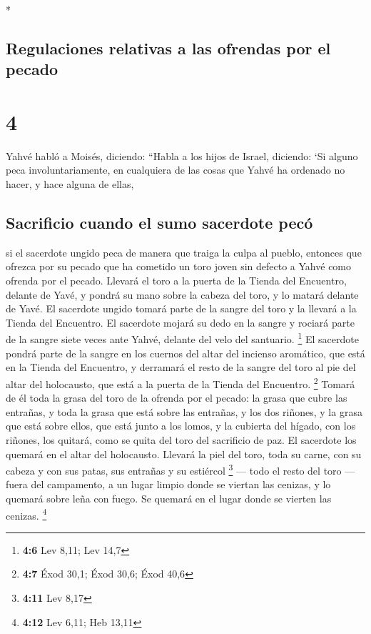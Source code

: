 \begin{paracol}{2}
\begin{otherlanguage}{english}
\end{otherlanguage}

\switchcolumn[0]*

\hypertarget{regulaciones-relativas-a-las-ofrendas-por-el-pecado}{%
\subsection{Regulaciones relativas a las ofrendas por el
pecado}\label{regulaciones-relativas-a-las-ofrendas-por-el-pecado}}

\hypertarget{section-6}{%
\section{4}\label{section-6}}

 Yahvé habló a Moisés, diciendo:  ``Habla a
los hijos de Israel, diciendo: `Si alguno peca involuntariamente, en
cualquiera de las cosas que Yahvé ha ordenado no hacer, y hace alguna de
ellas,

\hypertarget{sacrificio-cuando-el-sumo-sacerdote-pecuxf3}{%
\subsection{Sacrificio cuando el sumo sacerdote
pecó}\label{sacrificio-cuando-el-sumo-sacerdote-pecuxf3}}

 si el sacerdote ungido peca de manera que traiga la culpa
al pueblo, entonces que ofrezca por su pecado que ha cometido un toro
joven sin defecto a Yahvé como ofrenda por el pecado. 
Llevará el toro a la puerta de la Tienda del Encuentro, delante de Yavé,
y pondrá su mano sobre la cabeza del toro, y lo matará delante de Yavé.
 El sacerdote ungido tomará parte de la sangre del toro y
la llevará a la Tienda del Encuentro.  El sacerdote mojará
su dedo en la sangre y rociará parte de la sangre siete veces ante
Yahvé, delante del velo del santuario. \footnote{\textbf{4:6} Lev 8,11;
  Lev 14,7}  El sacerdote pondrá parte de la sangre en los
cuernos del altar del incienso aromático, que está en la Tienda del
Encuentro, y derramará el resto de la sangre del toro al pie del altar
del holocausto, que está a la puerta de la Tienda del Encuentro.
\footnote{\textbf{4:7} Éxod 30,1; Éxod 30,6; Éxod 40,6} 
Tomará de él toda la grasa del toro de la ofrenda por el pecado: la
grasa que cubre las entrañas, y toda la grasa que está sobre las
entrañas,  y los dos riñones, y la grasa que está sobre
ellos, que está junto a los lomos, y la cubierta del hígado, con los
riñones, los quitará,  como se quita del toro del
sacrificio de paz. El sacerdote los quemará en el altar del holocausto.
 Llevará la piel del toro, toda su carne, con su cabeza y
con sus patas, sus entrañas y su estiércol \footnote{\textbf{4:11} Lev
  8,17}  --- todo el resto del toro --- fuera del
campamento, a un lugar limpio donde se viertan las cenizas, y lo quemará
sobre leña con fuego. Se quemará en el lugar donde se vierten las
cenizas. \footnote{\textbf{4:12} Lev 6,11; Heb 13,11}


\end{paracol}
